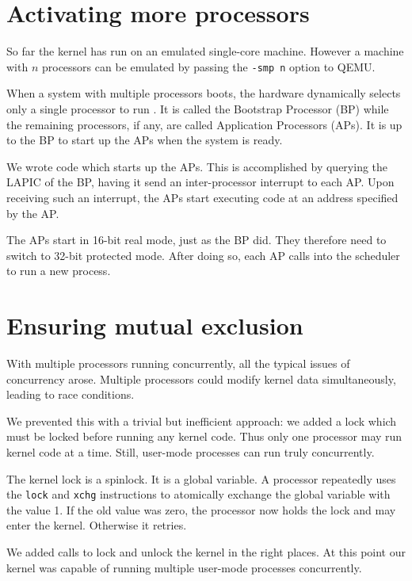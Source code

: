 \documentclass{report}
\begin{document}
\section{Activating more processors}
\label{sec:moreprocs}
So far the kernel has run on an emulated single-core machine. However a
machine with $n$ processors can be emulated by passing the \texttt{-smp n}
option to QEMU.

When a system with multiple processors boots, the hardware dynamically selects
only a single processor to run \cite[section~8.4]{intel3a}. It is called the
Bootstrap Processor (BP) while the remaining processors, if any, are called
Application Processors (APs). It is up to the BP to start up the APs when the
system is ready.

We wrote code which starts up the APs. This is accomplished by querying the
LAPIC of the BP, having it send an inter-processor interrupt to each AP. Upon
receiving such an interrupt, the APs start executing code at an address
specified by the AP.

The APs start in 16-bit real mode, just as the BP did. They therefore need to
switch to 32-bit protected mode. After doing so, each AP calls into the
scheduler to run a new process.



\section{Ensuring mutual exclusion}
With multiple processors running concurrently, all the typical issues of
concurrency arose. Multiple processors could modify kernel data
simultaneously, leading to race conditions.

We prevented this with a trivial but inefficient approach: we added a lock
which must be locked before running any kernel code. Thus only one processor
may run kernel code at a time. Still, user-mode processes can run truly
concurrently.

The kernel lock is a spinlock. It is a global variable. A processor repeatedly
uses the \texttt{lock} and \texttt{xchg} instructions to atomically exchange
the global variable with the value 1. If the old value was zero, the processor
now holds the lock and may enter the kernel. Otherwise it retries.

We added calls to lock and unlock the kernel in the right places. At this
point our kernel was capable of running multiple user-mode processes
concurrently.
\end{document}
